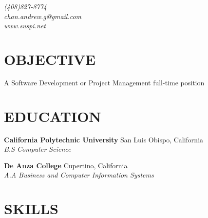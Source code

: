 \documentclass[margin,line]{resume}
\begin{document}
\fontsize{9.5pt}{9.5pt}\selectfont
\def \identsize {12mm}

{
  \sc
    \hfill {\infosize\textsl{(408)827-8774}}\\
    \hfill {\infosize\textsl{chan.andrew.g@gmail.com}}\\
    \hfill {\infosize\textsl{www.suspi.net}}\\
}

\begin{resume}

\vspace{1mm}

    \section{\mysidestyle \textbf{\large{O}\small{BJECTIVE}}}

    A Software Development or Project Management full-time position

\sectionline

    \section{\mysidestyle \textbf{\large{E}\small{DUCATION}}}

    \textbf{\listing California Polytechnic University} \hfill San Luis Obispo, California\\
    \hspace*{\identsize} \textsl{B.S Computer Science} \vspace{-2.5mm}
    
    \textbf{\listing De Anza College} \hfill Cupertino, California\\
    \hspace*{\identsize} \textsl{A.A Business and Computer Information Systems}

\sectionline

    \section{\mysidestyle \textbf{\large{S}\small{KILLS}}}


\end{resume}
\end{document}
